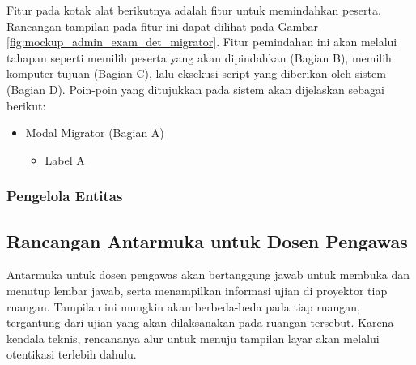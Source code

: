     Fitur pada kotak alat berikutnya adalah fitur untuk memindahkan peserta. Rancangan tampilan pada fitur ini
    dapat dilihat pada Gambar \ref{fig:mockup_admin_exam_det_migrator}. Fitur pemindahan ini akan melalui tahapan
    seperti memilih peserta yang akan dipindahkan (Bagian B), memilih komputer tujuan (Bagian C), lalu
    eksekusi script yang diberikan oleh sistem (Bagian D).
    Poin-poin yang ditujukkan pada sistem akan dijelaskan sebagai berikut:
    \begin{itemize}
        \item Modal Migrator (Bagian A)
            \begin{itemize}
                \item Label A
            \end{itemize}
    \end{itemize}
    
    
\subsubsection{Pengelola Entitas}

\subsection{Rancangan Antarmuka untuk Dosen Pengawas}
    Antarmuka untuk dosen pengawas akan bertanggung jawab untuk membuka dan menutup lembar jawab,
    serta menampilkan informasi ujian di proyektor tiap ruangan. Tampilan ini mungkin akan 
    berbeda-beda pada tiap ruangan, tergantung dari ujian yang akan dilaksanakan pada ruangan
    tersebut. Karena kendala teknis, rencananya alur untuk menuju tampilan layar akan melalui otentikasi
    terlebih dahulu. 
    
